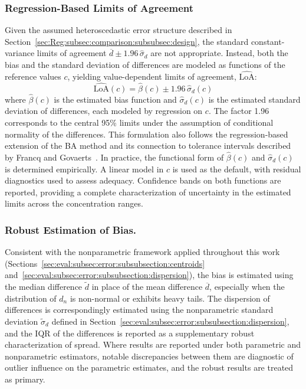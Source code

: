 \subsubsection{Regression-Based Limits of Agreement}
Given the assumed heteroscedastic error structure described in Section~\ref{sec:Reg:subsec:comparison:subsubsec:design}, the standard constant-variance limits of agreement $\overline{d} \pm 1.96\,\hat{\sigma}_d$ are not appropriate. Instead, both the bias and the standard deviation of differences are modeled as functions of the reference values $c$, yielding value-dependent limits of agreement, $\widehat{\mathrm{LoA}}$:
\begin{equation}\label{eqn:ba_loa_heteroscedastic}
    \widehat{\mathrm{LoA}}(c) = \hat{\beta}(c) \pm 1.96\,\hat{\sigma}_d(c)
\end{equation}
\noindent where $\hat{\beta}(c)$ is the estimated bias function and $\hat{\sigma}_d(c)$ is the estimated standard deviation of differences, each modeled by regression on $c$. The factor 1.96 corresponds to the central 95\% limits under the assumption of conditional normality of the differences. This formulation also follows the regression-based extension of the BA method and its connection to tolerance intervals described by Francq and Govaerts~\cite{Francq2016}. In practice, the functional form of $\hat{\beta}(c)$ and $\hat{\sigma}_d(c)$ is determined empirically. A linear model in $c$ is used as the default, with residual diagnostics used to assess adequacy. Confidence bands on both functions are reported, providing a complete characterization of uncertainty in the estimated limits across the concentration ranges.

\subsubsection{Robust Estimation of Bias.}
Consistent with the nonparametric framework applied throughout this work (Sections~\ref{sec:eval:subsec:error:subsubsection:centroids} and~\ref{sec:eval:subsec:error:subsubsection:dispersion}), the bias is estimated using the median difference $\widetilde{d}$ in place of the mean difference $\overline{d}$, especially when the distribution of $d_n$ is non-normal or exhibits heavy tails. The dispersion of differences is correspondingly estimated using the nonparametric standard deviation $\widetilde{\sigma}_d$ defined in Section~\ref{sec:eval:subsec:error:subsubsection:dispersion}, and the IQR of the differences is reported as a supplementary robust characterization of spread. Where results are reported under both parametric and nonparametric estimators, notable discrepancies between them are diagnostic of outlier influence on the parametric estimates, and the robust results are treated as primary.

